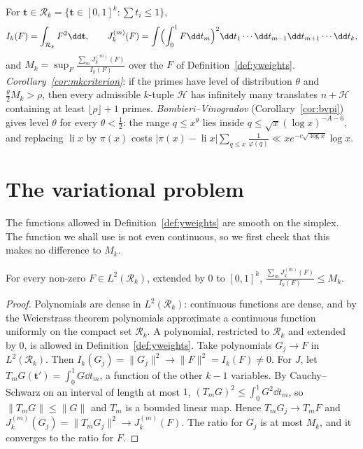 \begin{reminder}
For $\mathbf t\in\mathcal R_k=\{\mathbf t\in[0,1]^k:\sum t_i\le1\}$,
\[
I_k(F)=\int_{\mathcal R_k}F^2\dd\mathbf t,\qquad J_k^{(m)}(F)=\int\Bigl(\int_0^1F\dd t_m\Bigr)^2\dd t_1\cdots\dd t_{m-1}\dd t_{m+1}\cdots\dd t_k,
\]
and $M_k=\sup_F\frac{\sum_mJ_k^{(m)}(F)}{I_k(F)}$ over the $F$ of Definition~\ref{def:yweights}. \emph{Corollary~\ref{cor:mkcriterion}}: if the primes have level of distribution $\theta$ and $\frac\theta2M_k>\rho$, then every admissible $k$-tuple $\mathcal H$ has infinitely many translates $n+\mathcal H$ containing at least $\lfloor\rho\rfloor+1$ primes. \emph{Bombieri--Vinogradov} (Corollary~\ref{cor:bvpi}) gives level $\theta$ for every $\theta<\frac12$: the range $q\le x^\theta$ lies inside $q\le\sqrt x(\log x)^{-A-6}$, and replacing $\operatorname{li}x$ by $\pi(x)$ costs $|\pi(x)-\operatorname{li}x|\sum_{q\le x}\frac1{\varphi(q)}\ll x e^{-c\sqrt{\log x}}\log x$.
\end{reminder}

\section{The variational problem}

The functions allowed in Definition~\ref{def:yweights} are smooth on the simplex. The function we shall use is not even continuous, so we first check that this makes no difference to $M_k$.

\begin{lemma}\label{lem:ltwo}
For every non-zero $F\in L^2(\mathcal R_k)$, extended by $0$ to $[0,1]^k$, $\frac{\sum_mJ_k^{(m)}(F)}{I_k(F)}\le M_k$.
\end{lemma}
\begin{proof}
Polynomials are dense in $L^2(\mathcal R_k)$: continuous functions are dense, and by the Weierstrass theorem polynomials approximate a continuous function uniformly on the compact set $\mathcal R_k$. A polynomial, restricted to $\mathcal R_k$ and extended by $0$, is allowed in Definition~\ref{def:yweights}. Take polynomials $G_j\to F$ in $L^2(\mathcal R_k)$. Then $I_k(G_j)=\|G_j\|^2\to\|F\|^2=I_k(F)\ne0$. For $J$, let $T_mG(\mathbf t')=\int_0^1G\dd t_m$, a function of the other $k-1$ variables. By Cauchy--Schwarz on an interval of length at most $1$, $(T_mG)^2\le\int_0^1G^2\dd t_m$, so $\|T_mG\|\le\|G\|$ and $T_m$ is a bounded linear map. Hence $T_mG_j\to T_mF$ and $J_k^{(m)}(G_j)=\|T_mG_j\|^2\to J_k^{(m)}(F)$. The ratio for $G_j$ is at most $M_k$, and it converges to the ratio for $F$.
\end{proof}

